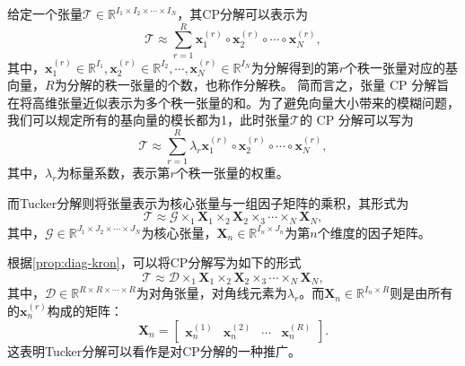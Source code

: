 给定一个张量\(\mathcal{T} \in \mathbb{R}^{I_1 \times I_2 \times \cdots \times I_N}\)，其CP分解可以表示为
\[
    \mathcal{T} \approx \sum_{r=1}^{R} \bm{x}_1^{(r)} \circ \bm{x}_2^{(r)} \circ \cdots \circ \bm{x}_N^{(r)},
\]
其中，\(\bm{x}_1^{(r)} \in \mathbb{R}^{I_1}, \bm{x}_2^{(r)} \in \mathbb{R}^{I_2}, \cdots, \bm{x}_N^{(r)} \in \mathbb{R}^{I_N}\)为分解得到的第\( r \)个秩一张量对应的基向量，\(R\)为分解的秩一张量的个数，也称作分解秩。 简而言之，张量 CP 分解旨在将高维张量近似表示为多个秩一张量的和。为了避免向量大小带来的模糊问题，我们可以规定所有的基向量的模长都为1，此时张量\( \mathcal{T} \)的 CP 分解可以写为
\[
    \mathcal{T} \approx \sum_{r=1}^{R} \lambda_r \bm{x}_1^{(r)} \circ \bm{x}_2^{(r)} \circ \cdots \circ \bm{x}_N^{(r)},
\]
其中，\(\lambda_r\)为标量系数，表示第\(r\)个秩一张量的权重。

而Tucker分解则将张量表示为核心张量与一组因子矩阵的乘积，其形式为
\[
    \mathcal{T} \approx \mathcal{G} \times_1 \mathbf{X}_1 \times_2 \mathbf{X}_2 \times_3 \cdots \times_N \mathbf{X}_N,
\]
其中，\(\mathcal{G} \in \mathbb{R}^{J_1 \times J_2 \times \cdots \times J_N}\)为核心张量，\(\mathbf{X}_n \in \mathbb{R}^{I_n \times J_n}\)为第\(n\)个维度的因子矩阵。

根据\cref{prop:diag-kron}，可以将CP分解写为如下的形式
\[
    \mathcal{T} \approx \mathcal{D} \times_1 \mathbf{X}_1 \times_2 \mathbf{X}_2 \times_3 \cdots \times_N \mathbf{X}_N,
\]
其中，\(\mathcal{D} \in \mathbb{R}^{R \times R \times \cdots \times R}\)为对角张量，对角线元素为\(\lambda_r\)。而\( \mathbf{X}_n \in \mathbb{R}^{I_n \times R} \)则是由所有的\( \bm{x}_n^{(r)} \)构成的矩阵：
\[
    \mathbf{X}_n = \begin{bmatrix} \bm{x}_n^{(1)} & \bm{x}_n^{(2)} & \cdots & \bm{x}_n^{(R)} \end{bmatrix}.
\]
这表明Tucker分解可以看作是对CP分解的一种推广。

